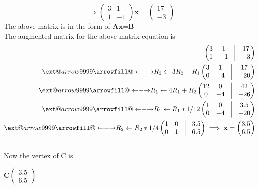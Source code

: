 \documentclass[10pt,a4paper]{report}
\makeatletter
\newcommand\xleftrightarrow[2][]{%
  \ext@arrow 9999{\longleftrightarrowfill@}{#1}{#2}}
\newcommand\longleftrightarrowfill@{%
  \arrowfill@\leftarrow\relbar\rightarrow}
\newcommand{\myvec}[1]{\ensuremath{\begin{pmatrix}#1\end{pmatrix}}}
\let\vec\mathbf
\makeatother
\begin{document}
\begin{multicols}{2}
		   \begin{equation}
			    \implies 
 \myvec{3 &  1 \\ 1 & -1 }\vec{x}  = \myvec{17 \\ -3}
		    \end{equation}
		    The above matrix is in the form of $\vec{Ax}$=$\vec{B}$\\
		    The augmented matrix for the above matrix equation is 
		    \begin{align}
		     \myvec{
				    3 & 1 & \vrule & 17
			    \\
			    1 & -1  &\vrule & -3
		    }
		    \\
		    \xleftrightarrow[]{R_2 \leftarrow 3R_2 -R_1 }
			    \myvec{
				    3 & 1 & \vrule & 17
			    \\
			    0 & -4  &\vrule & -20
		    }
		    \\
		    \xleftrightarrow[]{R_1 \leftarrow 4R_1 +R_2 }  
			    \myvec{
				    12 & 0 & \vrule & 42
			    \\
			    0 & -4  &\vrule & -26
		    }
		    \\
		     \xleftrightarrow[]{R_1 \leftarrow R_1* 1 /12 }
			    \myvec{
				    1 & 0 & \vrule & 3.5
			    \\
			    0 & -4  &\vrule & -20
			    }
			    \\
			     \xleftrightarrow[]{R_2 \leftarrow R_2* 1 /4 }
			    \myvec{
				    1 & 0 & \vrule & 3.5
			    \\
			    0 & 1  &\vrule & 6.5
			    }
			    \implies \vec{x} = \myvec{3.5 \\ 6.5}
          \end{align}
		    \\
		    Now the vertex of C is\\
		  \begin{center}
		    $\vec{C}\myvec{3.5 \\ 6.5}$\\
    \end{center}

\end{multicols}
\end{document}
